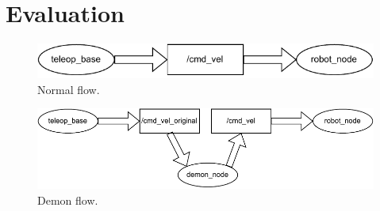 \chapter{Evaluation}
\label{chap:evaluation}

\begin{figure}
\includegraphics[width=\textwidth]{images/normal_flow.pdf}
\caption{Normal flow.} \label{fig3}
\end{figure}

\begin{figure}
\includegraphics[width=\textwidth]{images/demon_flow.pdf}
\caption{Demon flow.} \label{fig4}
\end{figure}